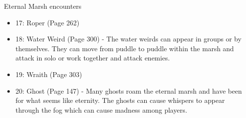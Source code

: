 \begin{commentbox}{Eternal Marsh encounters}
\begin{itemize}
		\item 17: Roper (Page 262)\\
		\item 18: Water Weird (Page 300) - The water weirds can appear in groups or by themselves. They can move from puddle to puddle within the marsh and attack in solo or work together and attack enemies.\\
		\item 19: Wraith (Page 303)\\
		\item 20: Ghost (Page 147) - Many ghosts roam the eternal marsh and have been for what seems like eternity. The ghosts can cause whispers to appear through the fog which can cause madness among players.
	\end{itemize}
\end{commentbox}


